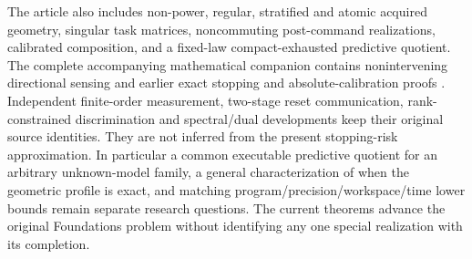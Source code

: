 The article also includes non-power, regular, stratified and atomic acquired geometry, singular task matrices, noncommuting post-command realizations, calibrated composition, and a fixed-law compact-exhausted predictive quotient. The complete accompanying mathematical companion contains nonintervening directional sensing and earlier exact stopping and absolute-calibration proofs \cite{Companion}. Independent finite-order measurement, two-stage reset communication, rank-constrained discrimination and spectral/dual developments keep their original source identities. They are not inferred from the present stopping-risk approximation. In particular a common executable predictive quotient for an arbitrary unknown-model family, a general characterization of when the geometric profile is exact, and matching program/precision/workspace/time lower bounds remain separate research questions. The current theorems advance the original Foundations problem without identifying any one special realization with its completion.
